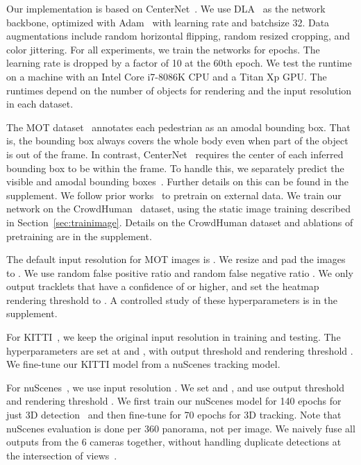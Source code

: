 \documentclass[runningheads]{llncs}
\begin{document}
Our implementation is based on CenterNet~\cite{zhou2019objects}.
We use DLA~\cite{yu2018deep} as the network backbone, optimized with Adam~\cite{kingma2014adam} with learning rate  and batchsize 32.
Data augmentations include random horizontal flipping, random resized cropping, and color jittering.
For all experiments, we train the networks for  epochs. The learning rate is dropped by a factor of 10 at the 60th epoch.
We test the runtime on a machine with an Intel Core i7-8086K CPU and a Titan Xp GPU. The runtimes depend on the number of objects for rendering and the input resolution in each dataset.

The MOT dataset~\cite{MOT16} annotates each pedestrian as an amodal bounding box. That is, the bounding box always covers the whole body even when part of the object is out of the frame.
In contrast, CenterNet~\cite{zhou2019objects} requires the center of each inferred bounding box to be within the frame. 
To handle this, we separately predict the visible and amodal bounding boxes~\cite{tian2019fcos}.
Further details on this can be found in the supplement.
We follow prior works~\cite{yu2016poi,zhang2018integrated,sadeghian2017tracking,son2017multi,tang2017multiple} to pretrain on external data. 
We train our network on the CrowdHuman~\cite{shao2018crowdhuman} dataset, using the static image training described in Section~\ref{sec:trainimage}.
Details on the CrowdHuman dataset and ablations of pretraining are in the supplement.

The default input resolution for MOT images is .
We resize and pad the images to . 
We use random false positive ratio  and random false negative ratio .
We only output tracklets that have a confidence of  or higher, and set the heatmap rendering threshold to .
A controlled study of these hyperparameters is in the supplement.

For KITTI~\cite{Geiger2012CVPR}, we keep the original input resolution  in training and testing. The hyperparameters are set at  and , with output threshold  and rendering threshold .
We fine-tune our KITTI model from a nuScenes tracking model.

For nuScenes~\cite{nuscenes2019}, we use input resolution . We set  and , and use output threshold  and rendering threshold .
We first train our nuScenes model for 140 epochs for just 3D detection~\cite{zhou2019objects} and then fine-tune for 70 epochs for 3D tracking.
Note that nuScenes evaluation is done per 360 panorama, not per image.
We naively fuse all outputs from the 6 cameras together, without handling duplicate detections at the intersection of views~\cite{simonelli2019disentangling}.
\end{document}
